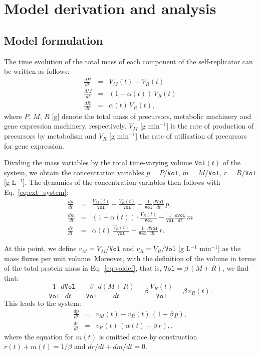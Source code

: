 \section{Model derivation and analysis}
\label{sec:supp_S1}

\subsection{Model formulation}

The time evolution of the total mass of each component of the self-replicator can be written as follows:
\begin{eqnarray}
\frac{dP}{dt} &=& V_M(t) - V_R(t) \nonumber \\
\frac{dM}{dt} &=& (1-\alpha(t))\, V_R(t) \label{eq:ext_system}\\
\frac{dR}{dt} &=& \alpha(t) \, V_R(t)  \nonumber ,
\end{eqnarray}
where $P$, $M$, $R$ [g] denote the total mass of precursors, metabolic machinery and gene expression machinery, respectively.
$V_M$ [g min$^{-1}$] is the rate of production of precursors by metabolism and $V_R$ [g min$^{-1}$] the rate of utilisation of precursors for gene expression.

Dividing the mass variables by the total time-varying volume $\texttt{Vol}(t)$ of the system, we obtain the concentration variables $p = P/\texttt{Vol}$, $m = M/\texttt{Vol}$, $r = R/\texttt{Vol}$ [g L$^{-1}$].
The dynamics of the concentration variables then follows with Eq.~\ref{eq:ext_system}:
\begin{eqnarray}
\frac{dp}{dt} &=& \frac{V_M(t)}{\texttt{Vol}} - \frac{V_R(t)}{\texttt{Vol}} - \frac{1}{\texttt{Vol}}\frac{d\texttt{Vol}}{dt}\, p, \nonumber \\
\frac{dm}{dt} &=& (1-\alpha(t))\cdot \frac{V_R(t)}{\texttt{Vol}} - \frac{1}{\texttt{Vol}}\frac{d\texttt{Vol}}{dt} \, m  \label{eq:deriv_int_system}\\ 
\frac{dr}{dt} &=& \alpha(t) \, \frac{V_R(t)}{\texttt{Vol}}  - \frac{1}{\texttt{Vol}}\frac{d\texttt{Vol}}{dt} \, r. \nonumber
\end{eqnarray}

At this point, we define $v_M = V_M/\texttt{Vol}$ and $v_R = V_R/\texttt{Vol}$ [g L$^{-1}$ min$^{-1}$] as the mass fluxes per unit volume.
Moreover, with the definition of the volume in terms of the total protein mass in Eq.~\ref{eq:voldef}, that is, $\texttt{Vol} = \beta\, (M + R)$, we find that:
\begin{equation}
\label{eq:sup_deriv_growthrate}
\frac{1}{\texttt{Vol}} \frac{d\texttt{Vol}}{dt} = \frac{\beta}{\texttt{Vol}} \frac{d(M+R)}{dt} = \beta\, \frac{V_R(t)}{\texttt{Vol}} = \beta \, v_R(t).
\end{equation}
This leads to the system:
\begin{eqnarray}
\frac{dp}{dt} &=& v_M(t) - v_R(t) \, (1+\beta\, p), \label{eq:sup_pdef}\\
\frac{dr}{dt} &=& v_R(t)  \, (\alpha(t) - \beta\, r), \label{eq:sup_rdef},
\end{eqnarray}
where the equation for $m(t)$ is omitted since by construction $r(t) + m(t) = 1/\beta$ and $dr/dt + dm/dt = 0$.

